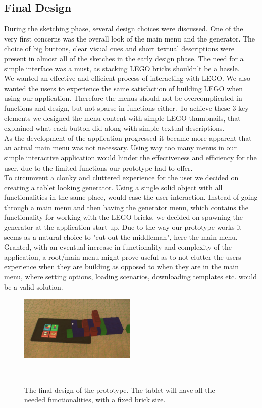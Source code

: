 \subsection{Final Design}
During the sketching phase, several design choices were discussed. One of the very first concerns was the overall look of the main menu and the generator. The choice of big buttons, clear visual cues and short textual descriptions were present in almost all of the sketches in the early design phase. The need for a simple interface was a must, as stacking LEGO bricks shouldn't be a hassle. \\
We wanted an effective and efficient process of interacting with LEGO. We also wanted the users to experience the same satisfaction of building LEGO when using our application. Therefore the menus should not be overcomplicated in functions and design, but not sparse in functions either. To achieve these 3 key elements we designed the menu content with simple LEGO thumbnails, that explained what each button did along with simple textual descriptions. \\
As the development of the application progressed it became more  apparent that an actual main menu was not necessary. Using way too many menus in our simple interactive application would hinder the effectiveness and efficiency for the user, due to the limited functions our prototype had to offer. \\
To circumvent a clonky and cluttered experience for the user we decided on creating a tablet looking generator. Using a single solid object with all functionalities in the same place, would ease the user interaction. Instead of going through a main menu and then having the generator menu, which contains the functionality for working with the LEGO bricks, we decided on spawning the generator at the application start up. Due to the way our prototype works it seems as a natural choice to "cut out the middleman", here the main menu.  \\ 
Granted, with an eventual increase in functionality and complexity of the application, a root/main menu might prove useful as to not clutter the users experience when they are building as opposed to when they are in the main menu, where setting options, loading scenarios, downloading templates etc. would be a valid solution.\\
\begin{figure}[t]
	\centering
	\includegraphics[width=210px]{figures/finaldesign.jpg}
	\caption{The final design of the prototype. The tablet will have all the needed functionalities, with a fixed brick size.}~\label{fig:finaldesign}
\end{figure}
